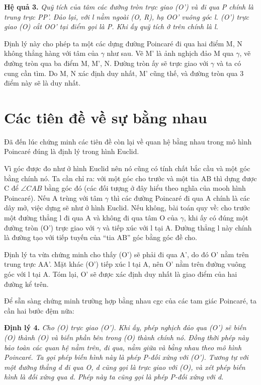 \textbf{Hệ quả 3.} \textit{ Quỹ tích của tâm các đường tròn trực giao (O’) và đi qua P chính là trung trực PP’.
Đảo lại, với l nằm ngoài (O, R), hạ OO’ vuông góc l. (O’) trực giao (O) cắt OO’ tại điểm gọi là P. Khi ấy quỹ tích ở trên chính là l.}

Định lý này cho phép ta một các dựng đường Poincar\'e đi qua hai điểm M, N không thẳng hàng với tâm của $\gamma$ như sau. Vẽ M’ là ảnh nghịch đảo M qua $\gamma$, vẽ đường tròn qua ba điểm M, M’, N. Đường tròn ấy sẽ trực giao với $\gamma$ và ta có cung cần tìm. Do M, N xác định duy nhất, M’ cũng thế, và đường tròn qua 3 điểm này sẽ là duy nhất.

\section{Các tiên đề về sự bằng nhau}
Đã đến lúc chứng minh các tiên đề còn lại về quan hệ bằng nhau trong mô hình Poincar\'e đúng là định lý trong hình Euclid.

Vì góc được đo như ở hình Euclid nên nó cũng có tính chất bắc cầu và một góc bằng chính nó. Ta cần chỉ ra: với một góc cho trước và một tia AB thì dựng được C để $ \angle CAB$ bằng góc đó (các đối tượng ở đây hiểu theo nghĩa của mooh hình Poincar\'e). Nếu A trùng với tâm $ \gamma$ thì các đường Poincar\'e đi qua A chính là các dây mở, việc dựng sẽ như ở hình Euclid.
 Nếu không, bài toán quy về: cho trước một đường thẳng l đi qua A và không đi qua tâm O của $\gamma$, khi ấy có đúng một đường tròn (O’) trực giao với $\gamma$ và tiếp xúc với l tại A. Đường thẳng l này chính là đường tạo với tiếp tuyến của ``tia AB” góc bằng góc đề cho. 

Định lý ta vừa chứng minh cho thấy (O’) sẽ phải đi qua A’, do đó O’ nằm trên trung trực AA’. Mặt khác (O’) tiếp xúc l tại A, nên O’ nằm trên đường vuông góc với l tại A. Tóm lại, O’ sẽ được xác định duy nhất là giao điểm của hai đường kể trên.

Để sẵn sàng chứng minh trường hợp bằng nhau cgc của các tam giác Poincar\'e, ta cần hai bước đệm nữa:

\textbf{Định lý 4.} \textit{ Cho (O) trực giao (O’). Khi ấy, phép nghịch đảo qua (O') sẽ biến (O) thành (O) và biến phần bên trong (O) thành chính nó. Đồng thời phép này bảo toàn các quan hệ nằm trên, đi qua, nằm giữa và bằng nhau theo mô hình Poincar\'e. Ta gọi phép biến hình này là phép P-đối xứng với (O').
Tương tự với một đường thẳng d đi qua O,  d cũng gọi là trực giao với (O), và xét phép biến hình là đối xứng qua d. Phép này ta cũng gọi là phép P-đối xứng với d.}

